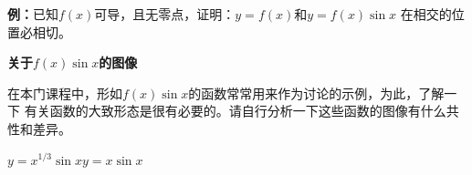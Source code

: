 {\bf 例：}已知$f(x)$可导，且无零点，证明：$y=f(x)$和$y=f(x)\sin x$
在相交的位置必相切。

\begin{shaded}
	{\bf 关于$f(x)\sin x$的图像}
	
	在本门课程中，形如$f(x)\sin x$的函数常常用来作为讨论的示例，为此，了解一下
	有关函数的大致形态是很有必要的。请自行分析一下这些函数的图像有什么共性和差异。
	\begin{center}
		\quad
		
		$y=x^{1/3}\sin x$\hspace{5cm}$y=x\sin x$
		

\end{center}
\end{shaded}
